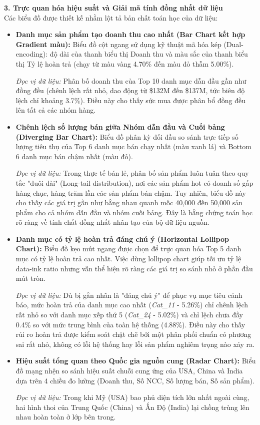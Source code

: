\textbf{3. Trực quan hóa hiệu suất và Giải mã tính đồng nhất dữ liệu} \\
Các biểu đồ được thiết kế nhằm lột tả bản chất toán học của dữ liệu:
\begin{itemize}
    \item \textbf{Danh mục sản phẩm tạo doanh thu cao nhất (Bar Chart kết hợp Gradient màu):} 
    Biểu đồ cột ngang sử dụng kỹ thuật mã hóa kép (Dual-encoding): độ dài của thanh biểu thị Doanh thu và màu sắc của thanh biểu thị Tỷ lệ hoàn trả (chạy từ màu vàng 4.70\% đến màu đỏ thẫm 5.00\%). 
    
    \textit{Đọc vị dữ liệu:} Phân bố doanh thu của Top 10 danh mục dẫn đầu gần như đồng đều (chênh lệch rất nhỏ, dao động từ \$132M đến \$137M, tức biên độ lệch chỉ khoảng 3.7\%). Điều này cho thấy sức mua được phân bổ đồng đều lên tất cả các nhóm hàng.
    
    \item \textbf{Chênh lệch số lượng bán giữa Nhóm dẫn đầu và Cuối bảng (Diverging Bar Chart):} 
    Biểu đồ phân kỳ đối đầu so sánh trực tiếp số lượng tiêu thụ của Top 6 danh mục bán chạy nhất (màu xanh lá) và Bottom 6 danh mục bán chậm nhất (màu đỏ). 
    
    \textit{Đọc vị dữ liệu:} Trong thực tế bán lẻ, phân bố sản phẩm luôn tuân theo quy tắc "đuôi dài" (Long-tail distribution), nơi các sản phẩm hot có doanh số gấp hàng chục, hàng trăm lần các sản phẩm bán chậm. Tuy nhiên, biểu đồ này cho thấy các giá trị gần như bằng nhau quanh mốc 40,000 đến 50,000 sản phẩm cho cả nhóm dẫn đầu và nhóm cuối bảng. Đây là bằng chứng toán học rõ ràng về tính chất đồng nhất nhân tạo của bộ dữ liệu nguồn.
    
    \item \textbf{Danh mục có tỷ lệ hoàn trả đáng chú ý (Horizontal Lollipop Chart):} 
    Biểu đồ kẹo mút ngang được chọn để trực quan hóa Top 5 danh mục có tỷ lệ hoàn trả cao nhất. Việc dùng lollipop chart giúp tối ưu tỷ lệ data-ink ratio \cite{tufte2001} nhưng vẫn thể hiện rõ ràng các giá trị so sánh nhỏ ở phần đầu mút tròn.
    
    \textit{Đọc vị dữ liệu:} Dù bị gắn nhãn là "đáng chú ý" để phục vụ mục tiêu cảnh báo, mức hoàn trả của danh mục cao nhất (\textit{Cat\_11} - 5.26\%) chỉ chênh lệch rất nhỏ so với danh mục xếp thứ 5 (\textit{Cat\_24} - 5.02\%) và chỉ lệch chưa đầy 0.4\% so với mức trung bình của toàn hệ thống (4.88\%). Điều này cho thấy rủi ro hoàn trả được kiểm soát chặt chẽ bởi một phân phối chuẩn có phương sai rất nhỏ, không có lỗi hệ thống hay lỗi sản phẩm nghiêm trọng nào xảy ra.
    
    \item \textbf{Hiệu suất tổng quan theo Quốc gia nguồn cung (Radar Chart):} 
    Biểu đồ mạng nhện so sánh hiệu suất chuỗi cung ứng của USA, China và India dựa trên 4 chiều đo lường (Doanh thu, Số NCC, Số lượng bán, Số sản phẩm). 
    
    \textit{Đọc vị dữ liệu:} Trong khi Mỹ (USA) bao phủ diện tích lớn nhất ngoài cùng, hai hình thoi của Trung Quốc (China) và Ấn Độ (India) lại chồng trùng lên nhau hoàn toàn ở lớp bên trong.
\end{itemize}

